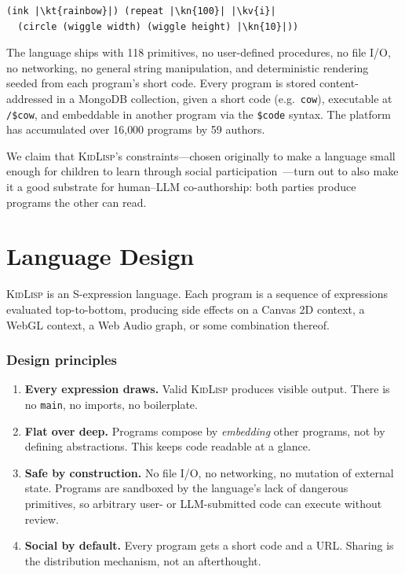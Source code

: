 \documentclass[letterpaper]{article}
\newcommand{\kn}[1]{\textcolor{klnum}{#1}}
\newcommand{\kt}[1]{\textcolor{klstr}{#1}}
\newcommand{\kv}[1]{\textcolor{klvar}{#1}}
\begin{document}
\begin{lstlisting}
(ink |\kt{rainbow}|) (repeat |\kn{100}| |\kv{i}|
  (circle (wiggle width) (wiggle height) |\kn{10}|))
\end{lstlisting}

The language ships with 118 primitives, no user-defined procedures, no file I/O, no networking, no general string manipulation, and deterministic rendering seeded from each program's short code. Every program is stored content-addressed in a MongoDB collection, given a short code (e.g.\ \texttt{cow}), executable at \texttt{/\$cow}, and embeddable in another program via the \texttt{\$code} syntax. The platform has accumulated over 16{,}000 programs by 59 authors.

We claim that \textsc{KidLisp}'s constraints---chosen originally to make a language small enough for children to learn through social participation~\cite{resnick2009scratch}---turn out to also make it a good substrate for human--LLM co-authorship: both parties produce programs the other can read.

\section{Language Design}

\textsc{KidLisp} is an S-expression language. Each program is a sequence of expressions evaluated top-to-bottom, producing side effects on a Canvas 2D context, a WebGL context, a Web Audio graph, or some combination thereof.

\subsubsection{Design principles}

\begin{enumerate}
  \item \textbf{Every expression draws.} Valid \textsc{KidLisp} produces visible output. There is no \texttt{main}, no imports, no boilerplate.
  \item \textbf{Flat over deep.} Programs compose by \emph{embedding} other programs, not by defining abstractions. This keeps code readable at a glance.
  \item \textbf{Safe by construction.} No file I/O, no networking, no mutation of external state. Programs are sandboxed by the language's lack of dangerous primitives, so arbitrary user- or LLM-submitted code can execute without review.
  \item \textbf{Social by default.} Every program gets a short code and a URL. Sharing is the distribution mechanism, not an afterthought.
\end{enumerate}
\end{document}
